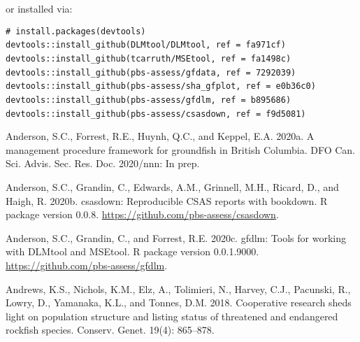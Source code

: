 \documentclass[11pt]{book}
\begin{document}
\vspace{4mm}

or installed via:

\texttt{\#\ install.packages(\textquotesingle{}devtools\textquotesingle{})}\\
\texttt{devtools::install\_github(\textquotesingle{}DLMtool/DLMtool\textquotesingle{},\ ref\ =\ \textquotesingle{}fa971cf\textquotesingle{})}~\\
\texttt{devtools::install\_github(\textquotesingle{}tcarruth/MSEtool\textquotesingle{},\ ref\ =\ \textquotesingle{}fa1498c\textquotesingle{})}~\\
\texttt{devtools::install\_github(\textquotesingle{}pbs-assess/gfdata\textquotesingle{},\ ref\ =\ \textquotesingle{}7292039\textquotesingle{})}~\\
\texttt{devtools::install\_github(\textquotesingle{}pbs-assess/sha\_gfplot\textquotesingle{},\ ref\ =\ \textquotesingle{}e0b36c0\textquotesingle{})}~\\
\texttt{devtools::install\_github(\textquotesingle{}pbs-assess/gfdlm\textquotesingle{},\ ref\ =\ \textquotesingle{}b895686\textquotesingle{})}~\\
\texttt{devtools::install\_github(\textquotesingle{}pbs-assess/csasdown\textquotesingle{},\ ref\ =\ \textquotesingle{}f9d5081\textquotesingle{})}~\\

\clearpage

\hypertarget{refs}{}
\leavevmode\hypertarget{ref-anderson2020gfmp}{}%
Anderson, S.C., Forrest, R.E., Huynh, Q.C., and Keppel, E.A. 2020a. A management procedure framework for groundfish in British Columbia. DFO Can. Sci. Advis. Sec. Res. Doc. 2020/nnn: In prep.

\leavevmode\hypertarget{ref-csasdown}{}%
Anderson, S.C., Grandin, C., Edwards, A.M., Grinnell, M.H., Ricard, D., and Haigh, R. 2020b. csasdown: Reproducible CSAS reports with bookdown. R package version 0.0.8. \url{https://github.com/pbs-assess/csasdown}.

\leavevmode\hypertarget{ref-gfdlm}{}%
Anderson, S.C., Grandin, C., and Forrest, R.E. 2020c. gfdlm: Tools for working with DLMtool and MSEtool. R package version 0.0.1.9000. \url{https://github.com/pbs-assess/gfdlm}.

\leavevmode\hypertarget{ref-andrews2018}{}%
Andrews, K.S., Nichols, K.M., Elz, A., Tolimieri, N., Harvey, C.J., Pacunski, R., Lowry, D., Yamanaka, K.L., and Tonnes, D.M. 2018. Cooperative research sheds light on population structure and listing status of threatened and endangered rockfish species. Conserv. Genet. 19(4): 865--878.
\end{document}

